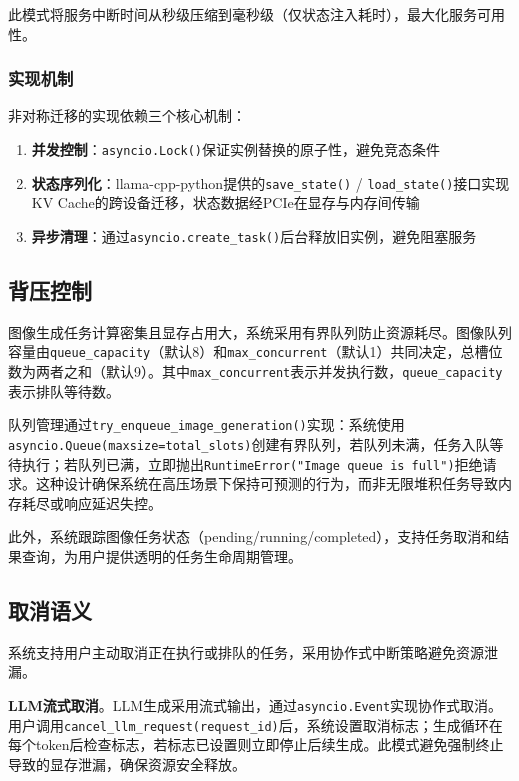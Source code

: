 此模式将服务中断时间从秒级压缩到毫秒级（仅状态注入耗时），最大化服务可用性。

\subsubsection{实现机制}

非对称迁移的实现依赖三个核心机制：
\begin{enumerate}
\item \textbf{并发控制}：\texttt{asyncio.Lock()}保证实例替换的原子性，避免竞态条件
\item \textbf{状态序列化}：llama-cpp-python提供的\texttt{save\_state()} / \texttt{load\_state()}接口实现KV Cache的跨设备迁移，状态数据经PCIe在显存与内存间传输
\item \textbf{异步清理}：通过\texttt{asyncio.create\_task()}后台释放旧实例，避免阻塞服务
\end{enumerate}

\subsection{背压控制}

图像生成任务计算密集且显存占用大，系统采用有界队列防止资源耗尽。图像队列容量由\texttt{queue\_capacity}（默认8）和\texttt{max\_concurrent}（默认1）共同决定，总槽位数为两者之和（默认9）。其中\texttt{max\_concurrent}表示并发执行数，\texttt{queue\_capacity}表示排队等待数。

队列管理通过\texttt{try\_enqueue\_image\_generation()}实现：系统使用\texttt{asyncio.Queue(maxsize=total\_slots)}创建有界队列，若队列未满，任务入队等待执行；若队列已满，立即抛出\texttt{RuntimeError("Image queue is full")}拒绝请求。这种设计确保系统在高压场景下保持可预测的行为，而非无限堆积任务导致内存耗尽或响应延迟失控。

此外，系统跟踪图像任务状态（pending/running/completed），支持任务取消和结果查询，为用户提供透明的任务生命周期管理。

\subsection{取消语义}

系统支持用户主动取消正在执行或排队的任务，采用协作式中断策略避免资源泄漏。

\textbf{LLM流式取消}。LLM生成采用流式输出，通过\texttt{asyncio.Event}实现协作式取消。用户调用\texttt{cancel\_llm\_request(request\_id)}后，系统设置取消标志；生成循环在每个token后检查标志，若标志已设置则立即停止后续生成。此模式避免强制终止导致的显存泄漏，确保资源安全释放。

